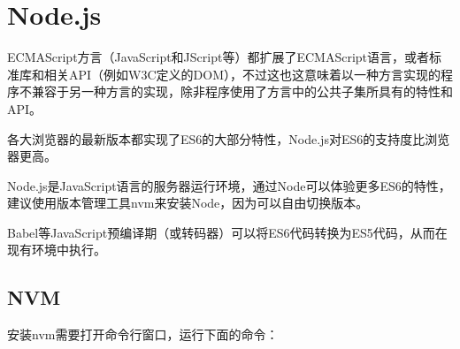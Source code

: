 \begin{lstlisting}[language=JavaScript]

\end{lstlisting}






\begin{lstlisting}[language=JavaScript]

\end{lstlisting}


\chapter{Node.js}

ECMAScript方言（JavaScript和JScript等）都扩展了ECMAScript语言，或者标准库和相关API（例如W3C定义的DOM），不过这也这意味着以一种方言实现的程序不兼容于另一种方言的实现，除非程序使用了方言中的公共子集所具有的特性和API。

各大浏览器的最新版本都实现了ES6的大部分特性，Node.js对ES6的支持度比浏览器更高。

Node.js是JavaScript语言的服务器运行环境，通过Node可以体验更多ES6的特性，建议使用版本管理工具nvm来安装Node，因为可以自由切换版本。

Babel等JavaScript预编译期（或转码器）可以将ES6代码转换为ES5代码，从而在现有环境中执行。

\section{NVM}


安装nvm需要打开命令行窗口，运行下面的命令：

